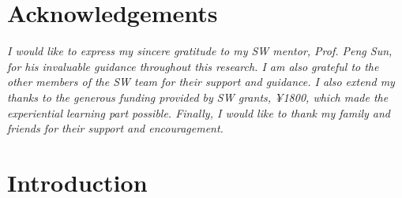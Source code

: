 \documentclass[11pt,a4paper,oneside]{report}
\newcommand{\instructions}[1]{{\color{black}\itshape #1}}
\begin{document}

\chapter*{Acknowledgements}
\label{acknowledgements}

\instructions{I would like to express my sincere gratitude to my SW mentor, Prof. Peng Sun, 
for his invaluable guidance throughout this research. 
I am also grateful to the other members of the SW team for their support and guidance. 
I also extend my thanks to the generous funding provided by SW grants, ¥1800, which made the experiential learning part possible. 
Finally, I would like to thank my family and friends for their support and encouragement. 
}

\newpage


\setcounter{tocdepth}{1}
\listoffigures\newpage


\setcounter{tocdepth}{1}
\listoftables\newpage


\clearpage
{}


\chapter{Introduction}
\label{introduction}
\end{document}
